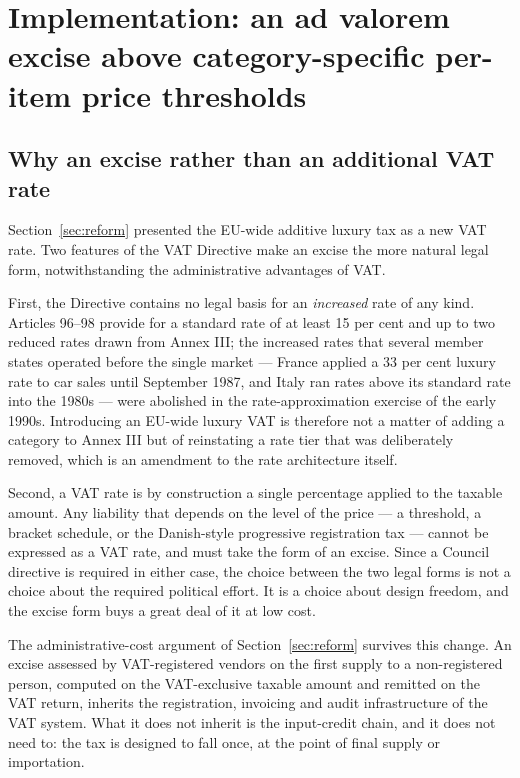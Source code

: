 
\section{Implementation: an ad valorem excise above category-specific per-item price thresholds}
\label{sec:implementation}

\subsection{Why an excise rather than an additional VAT rate}

Section~\ref{sec:reform} presented the EU-wide additive luxury tax as a new VAT rate. Two features
of the VAT Directive make an excise the more natural legal form, notwithstanding the administrative
advantages of VAT.

First, the Directive contains no legal basis for an \emph{increased} rate of any kind. Articles
96--98 provide for a standard rate of at least 15 per cent and up to two reduced rates drawn from
Annex III; the increased rates that several member states operated before the single market ---
France applied a 33 per cent luxury rate to car sales until September 1987, and
Italy ran rates above its standard rate into the 1980s --- were abolished in the rate-approximation
exercise of the early 1990s. Introducing an EU-wide luxury VAT is therefore not a matter of adding
a category to Annex III but of reinstating a rate tier that was deliberately removed, which is an
amendment to the rate architecture itself.

Second, a VAT rate is by construction a single percentage applied to the taxable amount. Any
liability that depends on the level of the price --- a threshold, a bracket schedule, or the
Danish-style progressive registration tax --- cannot be expressed as a VAT rate, and must take the
form of an excise. Since a Council directive is required in either case, the choice between the two
legal forms is not a choice about the required political effort. It is a choice about design
freedom, and the excise form buys a great deal of it at low cost.

The administrative-cost argument of Section~\ref{sec:reform} survives this change. An excise
assessed by VAT-registered vendors on the first supply to a non-registered person, computed on the
VAT-exclusive taxable amount and remitted on the VAT return, inherits the registration, invoicing
and audit infrastructure of the VAT system. What it does not inherit is the input-credit chain, and
it does not need to: the tax is designed to fall once, at the point of final supply or importation.

